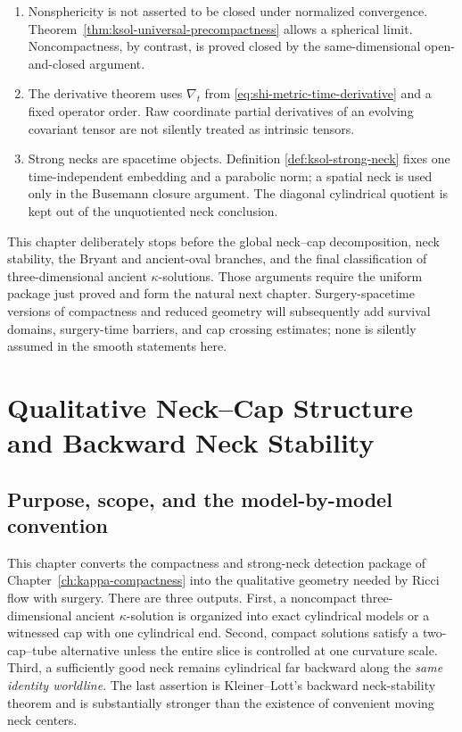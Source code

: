 \documentclass[10pt]{coll-l}
\theoremstyle{definition}
\theoremstyle{remark}
\numberwithin{section}{chapter}
\numberwithin{equation}{chapter}
\begin{document}
\begin{enumerate}
\item Nonsphericity is not asserted to be closed under normalized
      convergence.  Theorem~\ref{thm:ksol-universal-precompactness} allows a
      spherical limit.  Noncompactness, by contrast, is proved closed by
      the same-dimensional open-and-closed argument.

\item The derivative theorem uses $\nabla_t$ from
      \eqref{eq:shi-metric-time-derivative} and a fixed operator order.  Raw
      coordinate partial derivatives of an evolving covariant tensor are
      not silently treated as intrinsic tensors.

\item Strong necks are spacetime objects.  Definition
      \ref{def:ksol-strong-neck} fixes one time-independent embedding and a
      parabolic norm; a spatial neck is used only in the Busemann closure
      argument.  The diagonal cylindrical quotient is kept out of the
      unquotiented neck conclusion.
\end{enumerate}

This chapter deliberately stops before the global neck--cap decomposition,
neck stability, the Bryant and ancient-oval branches, and the final
classification of three-dimensional ancient $\kappa$-solutions.  Those
arguments require the uniform package just proved and form the natural next
chapter.  Surgery-spacetime versions of compactness and reduced geometry
will subsequently add survival domains, surgery-time barriers, and cap
crossing estimates; none is silently assumed in the smooth statements here.

\chapter[Qualitative Neck--Cap Structure and Neck Stability]
{Qualitative Neck--Cap Structure and Backward Neck Stability}
\label{ch:neck-cap-stability}

\section{Purpose, scope, and the model-by-model convention}
\label{sec:ncs-purpose}

This chapter converts the compactness and strong-neck detection package of
Chapter~\ref{ch:kappa-compactness} into the qualitative geometry needed by
Ricci flow with surgery.  There are three outputs.  First, a noncompact
three-dimensional ancient $\kappa$-solution is organized into exact
cylindrical models or a witnessed cap with one cylindrical end.  Second,
compact solutions satisfy a two-cap--tube alternative unless the entire
slice is controlled at one curvature scale.  Third, a sufficiently good
neck remains cylindrical far backward along the \emph{same identity
worldline}.  The last assertion is Kleiner--Lott's backward neck-stability
theorem and is substantially stronger than the existence of convenient
moving neck centers.
\end{document}

